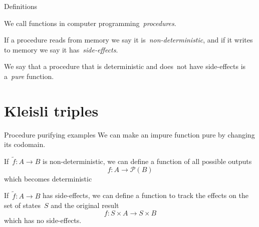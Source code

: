 \documentclass{beamer}
\begin{document}
\begin{frame}{Definitions}
    \begin{definition}[Procedure]
        We call functions in computer programming~\emph{procedures}.
    \end{definition}

    \pause

    \begin{definition}
        If a procedure reads from memory we say it is~\emph{non-deterministic},
        and if it writes to memory we say it has~\emph{side-effects}.

        We say that a procedure that is deterministic and does~\alert{not} have
        side-effects is a~\emph{pure} function.
    \end{definition}
\end{frame}

\section{Kleisli triples}

\begin{frame}{Procedure purifying examples}
    We can make an impure function pure by changing its codomain.


    \pause

    \begin{example}
        If~\(\tilde{f}:A\longrightarrow B\) is non-deterministic, we can define
        a function of all possible outputs
        \[
            f:A\longrightarrow\mathcal{P}(B)
        \]
        which becomes deterministic
    \end{example}

    \pause

    \begin{example}
        If~\(\tilde{f}:A\longrightarrow B\) has side-effects, we can define a
        function to track the effects on the set of states~\(S\) and the
        original result
        \[
            f:S\times A\longrightarrow S\times B
        \]
        which has no side-effects.
    \end{example}
\end{frame}
\end{document}
